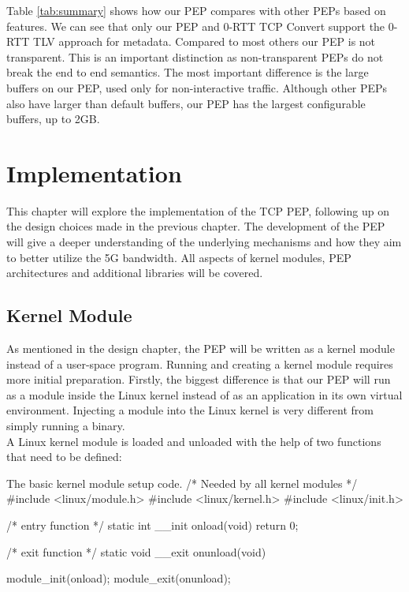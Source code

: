 \documentclass[a4paper,english, 12pt]{report}
\begin{document}
Table \ref{tab:summary} shows how our PEP compares with other PEPs based on features. We can see that only our PEP and 0-RTT TCP Convert support the 0-RTT TLV approach for metadata. Compared to most others our PEP is not transparent. This is an important distinction as non-transparent PEPs do not break the end to end semantics. The most important difference is the large buffers on our PEP, used only for non-interactive traffic. Although other PEPs also have larger than default buffers, our PEP has the largest configurable buffers, up to 2GB.\\




\chapter{Implementation}
This chapter will explore the implementation of the TCP PEP, following up on the design choices made in the previous chapter. The development of the PEP will give a deeper understanding of the underlying mechanisms and how they aim to better utilize the 5G bandwidth. All aspects of kernel modules, PEP architectures and additional libraries will be covered.

\section{Kernel Module}
As mentioned in the design chapter, the PEP will be written as a kernel module instead of a user-space program. Running and creating a kernel module requires more initial preparation. Firstly, the biggest difference is that our PEP will run as a module inside the Linux kernel instead of as an application in its own virtual environment. Injecting a module into the Linux kernel is very different from simply running a binary.\\

A Linux kernel module is loaded and unloaded with the help of two functions that need to be defined:\\

\begin{autonumlstlisting}[label=lst:module_example]{The basic kernel module setup code.}
/* Needed by all kernel modules */
#include <linux/module.h> 
#include <linux/kernel.h>
#include <linux/init.h>

/* entry function */
static int __init onload(void) {
    return 0;
}

/* exit function */
static void __exit onunload(void) {
    
}

module_init(onload);
module_exit(onunload);
\end{autonumlstlisting}
\end{document}
